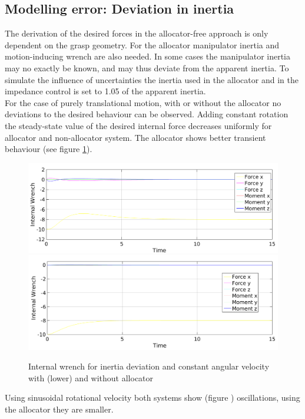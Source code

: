 \documentclass[conference]{IEEEtran}
\begin{document}
\subsection{Modelling error: Deviation in inertia}
The derivation of the desired forces in the allocator-free approach is only dependent on the grasp geometry. For the allocator manipulator inertia and motion-inducing wrench are also needed. In some cases the manipulator inertia may no exactly be known, and may thus deviate from the apparent inertia. To simulate the influence of uncertainties the inertia used in the allocator and in the impedance control is set to 1.05 of the apparent inertia.\\
For the case of purely translational motion, with or without the allocator no deviations to the desired behaviour can be observed.
Adding constant rotation the steady-state value of the desired internal force decreases uniformly for allocator and non-allocator system. The allocator shows better transient behaviour (see figure \ref{IntDevPT1}).
\begin{figure}
\includegraphics[width=\linewidth]{IntDevNullPT1}
\includegraphics[width=\linewidth]{IntDevAlloPT1}
\caption{Internal wrench for inertia deviation and constant angular velocity with (lower) and without allocator}
\label{IntDevPT1}
\end{figure}
Using sinusoidal rotational velocity both systems show (figure ) oscillations, using the allocator they are smaller.
\end{document}
